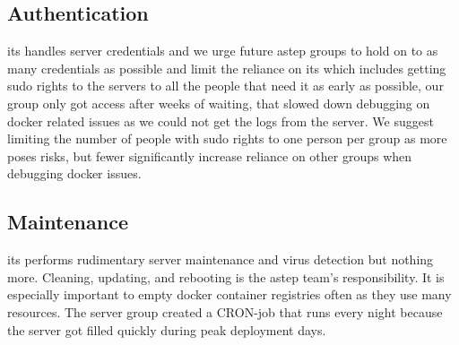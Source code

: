 \subsection*{Authentication}
\gls{its} handles server credentials and we urge future \gls{astep} groups to hold on to as many credentials as possible and limit the reliance on \gls{its} which includes getting sudo rights to the servers to all the people that need it as early as possible, our group only got access after weeks of waiting, that slowed down debugging on docker related issues as we could not get the logs from the server.
We suggest limiting the number of people with sudo rights to one person per group as more poses risks, but fewer significantly increase reliance on other groups when debugging \gls{docker} issues.

\subsection*{Maintenance}
\gls{its} performs rudimentary server maintenance and virus detection but nothing more. Cleaning, updating, and rebooting is the \gls{astep} team's responsibility. It is especially important to empty \gls{docker} container registries often as they use many resources. The server group created a CRON-job that runs every night because the server got filled quickly during peak deployment days. 